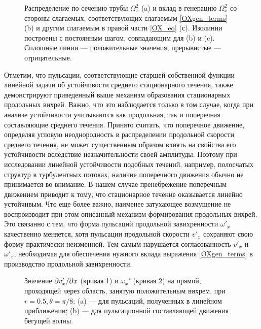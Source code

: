 \begin{figure}
\caption{Распределение по сечению трубы $\Omega_x^2$ (a) и вклад в генерацию $\Omega_x^2$ со стороны слагаемых, соответствующих слагаемым \eqref{OXgen_terms} (b) и другим слагаемым в правой части \eqref{OX_eq} (с). Изолинии построены с постоянным шагом, совпадающим для (b) и (c). Сплошные линии --- положительные значения, прерывистые --- отрицательные.}
\label{OXgen_pic}
\end{figure}

Отметим, что пульсации, соответствующие старшей собственной функции линейной задачи об устойчивости среднего стационарного течения, также демонстрируют приведенный выше механизм образования стационарных продольных вихрей. Важно, что это наблюдается только в том случае, когда при анализе устойчивости учитываются как продольная, так и поперечная составляющие среднего течения. Принято считать, что поперечное движение, определяя угловую неоднородность в распределении продольной скорости среднего течения, не может существенным образом влиять на свойства его устойчивости вследствие незначительности своей амплитуды. Поэтому при исследовании линейной устойчивости подобных течений, например, полосчатых структур в турбулентных потоках, наличие поперечного движения обычно не принимается во внимание. В нашем случае пренебрежение поперечным движением приводит к тому, что стационарное течение оказывается линейно устойчивым. Что еще более важно, наименее затухающее возмущение не воспроизводит при этом описанный механизм формирования продольных вихрей. Это связанно с тем, что форма пульсаций продольной завихренности $\omega'_x$ качественно меняется, хотя пульсации продольной скорости $v'_x$ сохраняют свою форму практически неизменной. Тем самым нарушается согласованность  $v'_x$ и $\omega'_x$, необходимая для обеспечения нужного вклада выражения \eqref{OXgen_terms} в производство продольной завихренности.

\begin{figure}
\caption{Значение $\partial v_x' /\partial x$ (кривая 1) и $\omega_x'$ (кривая 2) на прямой, проходящей через область, занятую положительным вихрем, при $r = 0.5, \theta = \pi/8$: (a) --- для пульсаций, полученных в линейном приближении; (b) --- для пульсационной составляющей движения бегущей волны. }
\label{OXgen_corr_pic}
\end{figure}

